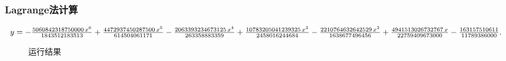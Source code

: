 \subsubsection{Lagrange法计算}

\qa 
$y=-\frac{5060842318750000\,x^6}{1843512183513}+\frac{4472937450287500\,x^5}{614504061171}-\frac{2063393234673125\,x^4}{263358883359}\\+\frac{10783205041239325\,x^3}{2458016244684}-\frac{2210764632642529\,x^2}{1638677496456}+\frac{4941513026732767\,x}{22759409673000}-\frac{163157510611}{11789386000}.$
\begin{figure}[H]
	\centering
	\hfill
	\caption{运行结果}
	\label{fig:cj12}
\end{figure}
